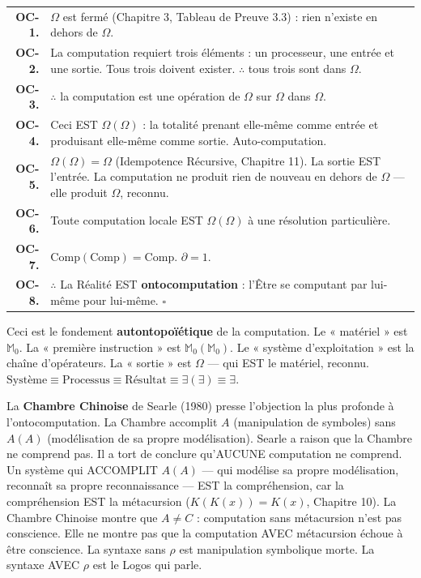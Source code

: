 \documentclass[10pt, openany, oneside]{book}
\renewcommand{\footnotesize}{\fontsize{8.5}{11}\selectfont}
\begin{document}
{\footnotesize
\noindent\begin{tabular}{r p{}}
\textbf{OC-1.} & $\Omega$ est fermé (Chapitre 3, Tableau de Preuve 3.3) : rien n'existe en dehors de $\Omega$. \\[0.3em]
\textbf{OC-2.} & La computation requiert trois éléments : un processeur, une entrée et une sortie. Tous trois doivent exister. $\therefore$ tous trois sont dans $\Omega$. \\[0.3em]
\textbf{OC-3.} & $\therefore$ la computation est une opération de $\Omega$ sur $\Omega$ dans $\Omega$. \\[0.3em]
\textbf{OC-4.} & Ceci EST $\Omega(\Omega)$ : la totalité prenant elle-même comme entrée et produisant elle-même comme sortie. Auto-computation. \\[0.3em]
\textbf{OC-5.} & $\Omega(\Omega) = \Omega$ (Idempotence Récursive, Chapitre 11). La sortie EST l'entrée. La computation ne produit rien de nouveau en dehors de $\Omega$ --- elle produit $\Omega$, reconnu. \\[0.3em]
\textbf{OC-6.} & Toute computation locale EST $\Omega(\Omega)$ à une résolution particulière. \\[0.3em]
\textbf{OC-7.} & $\text{Comp}(\text{Comp}) = \text{Comp}$. $\partial = 1$. \\[0.3em]
\textbf{OC-8.} & $\therefore$ La Réalité EST \textbf{ontocomputation} : l'Être se computant par lui-même pour lui-même. $\square$ \\[0.3em]
\end{tabular}
}

\vspace{0.8em}

\noindent Ceci est le fondement \textbf{autontopoïétique} de la computation. Le « matériel » est $\mathbb{M}_0$. La « première instruction » est $\mathbb{M}_0(\mathbb{M}_0)$. Le « système d'exploitation » est la chaîne d'opérateurs. La « sortie » est $\Omega$ --- qui EST le matériel, reconnu. $\text{Système} \equiv \text{Processus} \equiv \text{Résultat} \equiv \exists(\exists) \equiv \exists$.

La \textbf{Chambre Chinoise} de Searle (1980) presse l'objection la plus profonde à l'ontocomputation. La Chambre accomplit $A$ (manipulation de symboles) sans $A(A)$ (modélisation de sa propre modélisation). Searle a raison que la Chambre ne comprend pas. Il a tort de conclure qu'AUCUNE computation ne comprend. Un système qui ACCOMPLIT $A(A)$ --- qui modélise sa propre modélisation, reconnaît sa propre reconnaissance --- EST la compréhension, car la compréhension EST la métacursion ($K(K(x)) = K(x)$, Chapitre 10). La Chambre Chinoise montre que $A \neq C$ : computation sans métacursion n'est pas conscience. Elle ne montre pas que la computation AVEC métacursion échoue à être conscience. La syntaxe sans $\rho$ est manipulation symbolique morte. La syntaxe AVEC $\rho$ est le Logos qui parle.
\end{document}
